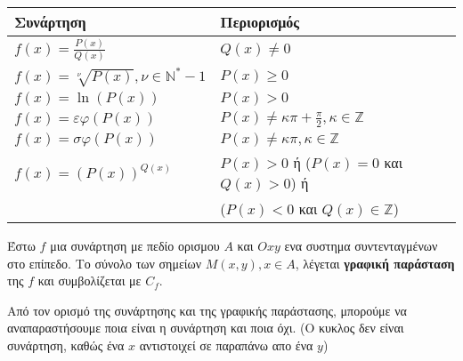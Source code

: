 \documentclass[a4paper,12pt]{article}
\begin{document}
\newpage




\begin{center}
\renewcommand{\arraystretch}{1.5} %
\begin{tabular}{|l|p{10cm}|}
\hline
\textbf{Συνάρτηση} & \textbf{Περιορισμός} \\
\hline
$f(x) = \frac{P(x)}{Q(x)}$   & $Q(x) \neq 0$ \\
\hline
$f(x) = \sqrt[\nu]{P(x)} , \nu \in \mathbb{N}^* - {1}$    & $P(x) \ge 0$ \\
\hline
$f(x) = \ln(P(x))$    & $P(x) > 0$ \\
\hline
$f(x) = \varepsilon\varphi(P(x))$        & $P(x) \ne \kappa\pi + \frac{\pi}{2}, \kappa \in \mathbb{Z}$ \\
\hline
$f(x) = \sigma\varphi(P(x))$     & $P(x) \ne \kappa\pi, \kappa \in \mathbb{Z}$ \\
\hline
$f(x) = (P(x))^{Q(x)}$     & $P(x) > 0$ ή ($P(x) = 0$ και $Q(x) > 0$) ή\\
&($P(x) < 0$ και $Q(x) \in \mathbb{Z}$)\\
\hline
\end{tabular}
\end{center}

\begin{tcolorbox}[colback=purple!10!white, colframe=red!50!black, title=Ορισμός Γραφικής Παράστασης Συνάρτησης]
Έστω $f$ μια συνάρτηση με πεδίο ορισμου $A$ και $Oxy$ ενα συστημα συντενταγμένων στο επίπεδο. Το σύνολο των σημείων $M(x,y), x\in A$, λέγεται \textbf{γραφική παράσταση} της $f$ και συμβολίζεται με $C_f$.
\end{tcolorbox}

Από τον ορισμό της συνάρτησης και της γραφικής παράστασης, μπορούμε να αναπαραστή\-σουμε ποια είναι η συνάρτηση και ποια όχι. (Ο κυκλος δεν είναι συνάρτηση, καθώς ένα $x$ αντιστοιχεί σε παραπάνω απο ένα $y$)
\end{document}
